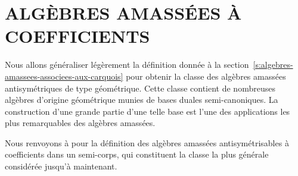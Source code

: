 \documentclass[brochure,12pt]{bourbaki}
\newcommand{\og}{\guillemotleft\hspace*{1pt}}
\newcommand{\fg}{\hspace*{1pt}\guillemotright}
\numberwithin{equation}{subsection}
\numberwithin{theorem}{section}
\begin{document}
\section{ALG\`EBRES AMASS\'EES \`A COEFFICIENTS}
\label{s:algebres-amassees-a-coefficients}

Nous allons g\'en\'eraliser l\'eg\`erement la d\'efinition
donn\'ee \`a la section~\ref{s:algebres-amassees-associees-aux-carquois}
pour obtenir la classe des \og alg\`ebres
amass\'ees antisym\'etriques de type g\'eom\'etrique\fg.
Cette classe contient de nombreuses alg\`ebres d'origine
g\'eom\'etrique munies de \og bases duales semi-canoniques\fg.
La construction d'une grande partie d'une telle base est l'une
des applications les plus remarquables des alg\`ebres amass\'ees.

Nous renvoyons \`a \cite{FominZelevinsky07}
pour la d\'efinition des \og alg\`ebres amass\'ees antisym\'etrisables
\`a coefficients dans un semi-corps\fg, qui constituent la classe
la plus g\'en\'erale consid\'er\'ee jusqu'\`a maintenant.
\end{document}
